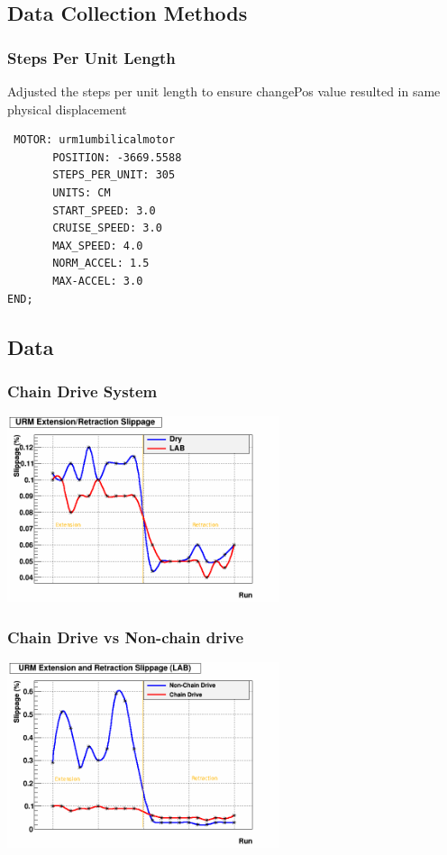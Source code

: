 \documentclass{beamer}
\begin{document}
\subsection{Data Collection Methods}




\begin{frame}[fragile] %
\frametitle{Steps Per Unit Length}
Adjusted the steps per unit length to ensure changePos value resulted in same physical displacement \\
\begin{example}
\begin{verbatim} MOTOR: urm1umbilicalmotor
	   POSITION: -3669.5588
	   STEPS_PER_UNIT: 305
	   UNITS: CM
	   START_SPEED: 3.0
	   CRUISE_SPEED: 3.0
	   MAX_SPEED: 4.0
	   NORM_ACCEL: 1.5
	   MAX-ACCEL: 3.0
END;
\end{verbatim}
\end{example}
\end{frame}



\subsection{Data}
\begin{frame}
\frametitle{Chain Drive System}
\centering\includegraphics[width=8cm]{URMextdry.png}
\end{frame}

\begin{frame}
\frametitle{Chain Drive vs Non-chain drive}
\centering\includegraphics[width=8cm]{URMextandretdiff.png}
\end{frame}
\end{document}

